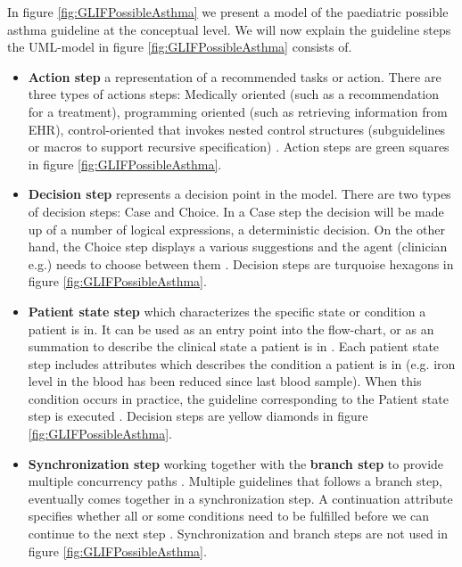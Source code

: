 \begin{itemize}
	In figure \ref{fig:GLIFPossibleAsthma} we present a model of the paediatric possible asthma guideline \cite{RepublicofKeny2016} at the conceptual level. We will now explain the guideline steps the UML-model in figure \ref{fig:GLIFPossibleAsthma} consists of.
	\begin{itemize}
		\item \textbf{Action step} a representation of a recommended tasks or action. There are three types of actions steps: Medically oriented (such as a recommendation for a treatment), programming oriented (such as retrieving information from EHR), control-oriented that invokes nested control structures (subguidelines or macros to support recursive specification) \parencite{DeClercq2008}. Action steps are green squares in figure \ref{fig:GLIFPossibleAsthma}.
		\item \textbf{Decision step} represents a decision point in the model. There are two types of decision steps: Case and Choice. In a Case step the decision will be made up of a number of logical expressions, a deterministic decision. On the other hand, the Choice step displays a various suggestions and the agent (clinician e.g.) needs to choose between them \parencite{DeClercq2008}. Decision steps are turquoise hexagons in figure \ref{fig:GLIFPossibleAsthma}.
		\item \textbf{Patient state step} which characterizes the specific state or condition a patient is in. It can	be used as an entry point into the 
flow-chart, or as an summation to describe the clinical state a patient is in \parencite{Boxwala2004}. Each patient state step includes attributes which describes the condition a patient is in (e.g. iron level in the blood has been reduced since last blood sample). When this condition occurs in practice, the guideline corresponding	to the Patient state step is executed \parencite{DeClercq2008}. Decision steps are yellow diamonds in figure \ref{fig:GLIFPossibleAsthma}.
		\item \textbf{Synchronization step} working together with the \textbf{branch step} to provide multiple concurrency paths \parencite{Boxwala2004}. Multiple guidelines that follows a branch step, eventually comes together in a synchronization step. A continuation attribute specifies	whether all or some conditions need to be fulfilled before we can continue to the next step \parencite{DeClercq2008}. Synchronization and branch steps are not used in figure \ref{fig:GLIFPossibleAsthma}.
	\end{itemize}
	 

\end{itemize}
